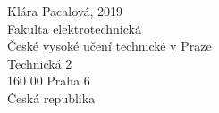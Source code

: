 \vfill
\textsuperscript{\textcopyright} Klára Pacalová, 2019\\
Fakulta elektrotechnická\\
České vysoké učení technické v Praze\\
Technická 2\\
160 00 Praha 6\\
Česká republika